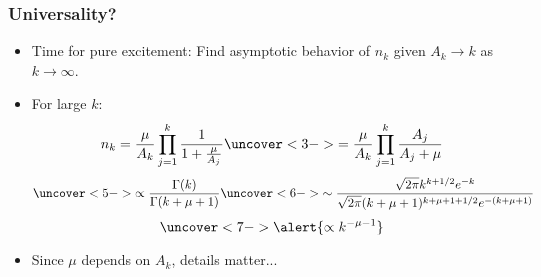 \begin{frame}
  \frametitle{Universality?}

  \begin{itemize}
  \item<1->
    Time for pure excitement: Find \alert{asymptotic behavior} 
    of $n_k$ given $A_k \rightarrow k$ as $k \rightarrow \infty$.
  \item<2->
    For large $k$:
    $$
    n_k = 
    \frac{\mu}{A_k}
    \prod_{j=1}^{k}
    \frac{1}{1 + \frac{\mu}{A_j}}
    \uncover<3->{
      =
      \frac{\mu}{A_k}
      \prod_{j=1}^{k}
      \frac{A_j}{A_j + \mu}
    }
    $$
    $$
    \uncover<5->{
      \propto
      \frac{\Gamma(k)}{\Gamma(k + \mu + 1)}
    }
    \uncover<6->{
      \sim
      \frac{\sqrt{2\pi} k^{k+1/2} e^{-k}}
      {\sqrt{2\pi} (k+\mu+1)^{k+\mu+1+1/2}e^{-(k+\mu+1)}}
    }
    $$
    $$
    \uncover<7->{
      \alert{ \propto k^{-\mu-1} }
    }
    $$
  \item<8->
    Since $\mu$ depends on $A_k$, \alert{details matter...}
  \end{itemize}

\end{frame}


